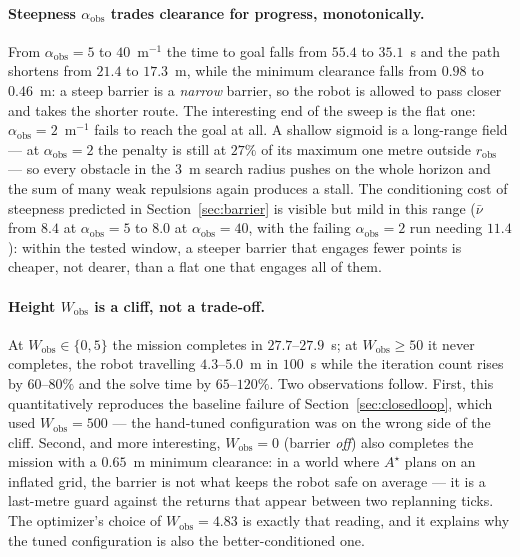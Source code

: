 \documentclass[11pt,a4paper]{article}
\newcommand{\astar}{$A^\star$}
\newcommand{\Wobs}{W_{\mathrm{obs}}}
\newcommand{\aobs}{\alpha_{\mathrm{obs}}}
\newcommand{\robs}{r_{\mathrm{obs}}}
\begin{document}
\paragraph{Steepness $\aobs$ trades clearance for progress, monotonically.} From $\aobs=5$ to $40$~m$^{-1}$
the time to goal falls from $55.4$ to $35.1$~s and the path shortens from $21.4$ to $17.3$~m, while the
minimum clearance falls from $0.98$ to $0.46$~m: a steep barrier is a \emph{narrow} barrier, so the robot is
allowed to pass closer and takes the shorter route. The interesting end of the sweep is the flat one:
$\aobs=2$~m$^{-1}$ fails to reach the goal at all. A shallow sigmoid is a long-range field --- at
$\aobs=2$ the penalty is still at $27\%$ of its maximum one metre outside $\robs$ --- so every obstacle in the
$3$~m search radius pushes on the whole horizon and the sum of many weak repulsions again produces a stall.
The conditioning cost of steepness predicted in Section~\ref{sec:barrier} is visible but mild in this range
($\bar\nu$ from $8.4$ at $\aobs=5$ to $8.0$ at $\aobs=40$, with the failing $\aobs=2$ run needing $11.4$):
within the tested window, a steeper barrier that engages fewer points is cheaper, not dearer, than a flat one
that engages all of them.

\paragraph{Height $\Wobs$ is a cliff, not a trade-off.} At $\Wobs\in\{0,5\}$ the mission completes in
$27.7$--$27.9$~s; at $\Wobs\ge50$ it never completes, the robot travelling $4.3$--$5.0$~m in $100$~s while
the iteration count rises by $60$--$80\%$ and the solve time by $65$--$120\%$. Two observations follow. First,
this quantitatively reproduces the baseline failure of Section~\ref{sec:closedloop}, which used
$\Wobs=500$ --- the hand-tuned configuration was on the wrong side of the cliff. Second, and more
interesting, $\Wobs=0$ (barrier \emph{off}) also completes the mission with a $0.65$~m minimum clearance:
in a world where \astar{} plans on an inflated grid, the barrier is not what keeps the robot safe on average
--- it is a last-metre guard against the returns that appear between two replanning ticks. The optimizer's
choice of $\Wobs=4.83$ is exactly that reading, and it explains why the tuned configuration is also the
better-conditioned one.
\end{document}
